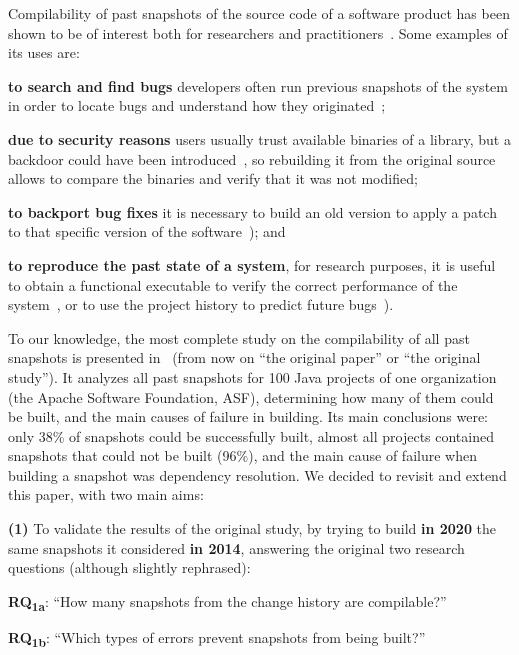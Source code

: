 Compilability of past snapshots of the source code of a software product has been shown to be of interest both for researchers and practitioners~\cite{nikitin2017chainiac,RepBlds:2017:Online}. 
Some examples of its uses are:
\begin{inparaenum}[\bf(1)]
	\item {\bf to search and find bugs} developers often run previous snapshots of the system in order to locate bugs and understand how they originated~\cite{Zimmermann:2006:MVA:1137983.1138001};
	\item {\bf due to security reasons} users usually trust available binaries of a library, but a backdoor could have been introduced~\cite{deCarnedeCarnavalet:2014:CIV:2664243.2664288}, so rebuilding it from the original source allows to compare the binaries and verify that it was not modified; 
	\item {\bf to backport bug fixes} it is necessary to build an old version to apply a patch to that specific version of the software~\cite{tian2017mining}); and
	\item {\bf to reproduce the past state of a system}, for research purposes, it is useful to obtain a functional executable to verify the correct performance of the system~\cite{manacero2011using}, or to use the project history to predict future bugs~\cite{Zimmermann2008}).
\end{inparaenum}

To our knowledge, the most complete study on the compilability of all past snapshots is presented in~\cite{tufano2017there} (from now on ``the original paper'' or ``the original study''). It analyzes all past snapshots for 100 Java projects of one organization (the Apache Software Foundation, ASF), determining how many of them could be built, and the main causes of failure in building. Its main conclusions were: only 38\% of snapshots could be successfully built, almost all projects contained snapshots that could not be built (96\%), and the main cause of failure when building a snapshot was dependency resolution. We decided to revisit and extend this paper, with two main aims:

\textbf{(1)} To validate the results of the original study, by trying to build {\bf in 2020} the same snapshots it considered {\bf in 2014}, answering the original two research questions (although slightly rephrased):

\textbf{RQ\textsubscript{1a}}: ``How many snapshots from the change history are compilable?''

\textbf{RQ\textsubscript{1b}}: ``Which types of errors prevent snapshots from being built?''

